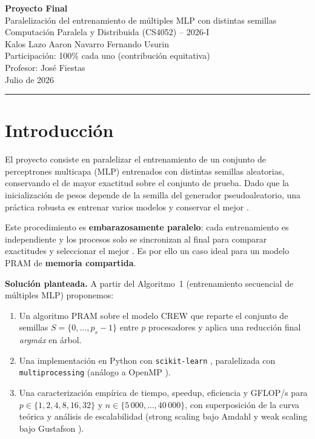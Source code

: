 \documentclass[11pt,a4paper]{article}
\begin{document}
\begin{center}
\vspace*{0.3cm}
{\Large\bfseries Proyecto Final}\\[0.2cm]
{\large Paralelización del entrenamiento de múltiples MLP con distintas semillas}\\[0.15cm]
{\normalsize Computación Paralela y Distribuida (CS4052) -- 2026-I}\\[0.45cm]
Kalos Lazo \quad Aaron Navarro \quad Fernando Usurin\\[0.1cm]
{\small Participación: 100\% cada uno (contribución equitativa)}\\[0.1cm]
{\small Profesor: José Fiestas}\\[0.1cm]
{\small Julio de 2026}
\end{center}
\rule{\textwidth}{0.4pt}
\vspace{0.2cm}

\section{Introducción}

El proyecto consiste en paralelizar el entrenamiento de un conjunto de
perceptrones multicapa (MLP) entrenados con distintas semillas aleatorias,
conservando el de mayor exactitud sobre el conjunto de prueba. Dado que la
inicialización de pesos depende de la semilla del generador pseudoaleatorio,
una práctica robusta es entrenar varios modelos y conservar el mejor
\cite{lecun2015,goodfellow2016}.

Este procedimiento es \textbf{embarazosamente paralelo}: cada entrenamiento es
independiente y los procesos solo se sincronizan al final para comparar
exactitudes y seleccionar el mejor \cite{farias2023}. Es por ello un caso ideal
para un modelo PRAM de \textbf{memoria compartida}.

\textbf{Solución planteada.} A partir del Algoritmo~1 (entrenamiento secuencial de
múltiples MLP) proponemos:
\begin{enumerate}
  \item Un algoritmo PRAM sobre el modelo CREW que reparte el conjunto de
        semillas $S=\{0,\dots,p_s-1\}$ entre $p$ procesadores y aplica una
        reducción final \emph{arg\-máx} en árbol.
  \item Una implementación en Python con \texttt{scikit-learn}
        \cite{pedregosa2011,buitinck2013}, paralelizada con
        \texttt{multiprocessing} (análogo a OpenMP \cite{dagum1998,chapman2007}).
  \item Una caracterización empírica de tiempo, speedup, eficiencia y GFLOP/s
        para $p\in\{1,2,4,8,16,32\}$ y $n\in\{5\,000,\dots,40\,000\}$, con
        superposición de la curva teórica y análisis de escalabilidad
        (strong scaling bajo Amdahl \cite{amdahl1967,hill2008} y weak scaling bajo
        Gustafson \cite{gustafson1988}).
\end{enumerate}
\end{document}
